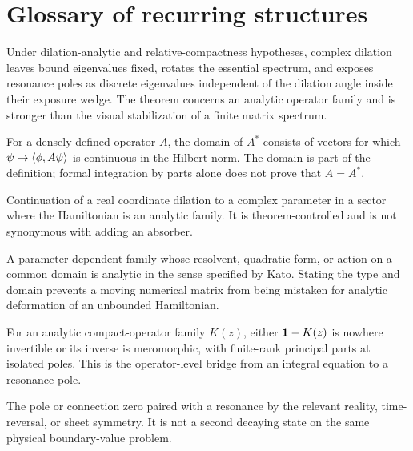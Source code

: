\chapter{Glossary of recurring structures}
\label{chap:glossary}

\begin{description}[style=nextline]
  \item[Aguilar--Balslev--Combes theorem (ABC theorem).]
  Under dilation-analytic and relative-compactness hypotheses, complex
  dilation leaves bound eigenvalues fixed, rotates the essential spectrum,
  and exposes resonance poles as discrete eigenvalues independent of the
  dilation angle inside their exposure wedge.  The theorem concerns an
  analytic operator family and is stronger than the visual stabilization of
  a finite matrix spectrum.

  \item[Adjoint operator.]
  For a densely defined operator $A$, the domain of $A^*$ consists of vectors
  for which $\psi\mapsto\langle \phi,A\psi\rangle$ is continuous in the
  Hilbert norm.  The domain is part of the definition; formal integration by
  parts alone does not prove that $A=A^*$.
  \item[Analytic dilation.] Continuation of a real coordinate dilation to a
  complex parameter in a sector where the Hamiltonian is an analytic family.
  It is theorem-controlled and is not synonymous with adding an absorber.

  \item[Analytic family of operators.]
  A parameter-dependent family whose resolvent, quadratic form, or action on
  a common domain is analytic in the sense specified by Kato.  Stating the
  type and domain prevents a moving numerical matrix from being mistaken for
  analytic deformation of an unbounded Hamiltonian.

  \item[Analytic Fredholm theorem.]
  For an analytic compact-operator family $K(z)$, either
  $\mathbf{1}-K(z)$ is nowhere invertible or its inverse is meromorphic, with
  finite-rank principal parts at isolated poles.  This is the operator-level
  bridge from an integral equation to a resonance pole.

  \item[Antiresonance.]
  The pole or connection zero paired with a resonance by the relevant
  reality, time-reversal, or sheet symmetry.  It is not a second decaying
  state on the same physical boundary-value problem.


\end{description}
